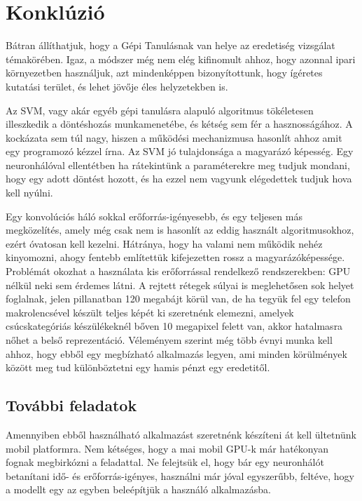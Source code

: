 \newpage
\section{Konklúzió}


Bátran állíthatjuk, hogy a Gépi Tanulásnak van helye az eredetiség vizsgálat témakörében.
Igaz, a módszer még nem elég kifinomult ahhoz, hogy azonnal ipari környezetben használjuk,
azt mindenképpen bizonyítottunk, hogy ígéretes kutatási terület, és lehet jövője éles 
helyzetekben is.


Az SVM, vagy akár egyéb gépi tanulásra alapuló algoritmus tökéletesen illeszkedik
a döntéshozás munkamenetébe, és kétség sem fér a hasznosságához. A kockázata sem 
túl nagy, hiszen a működési mechanizmusa hasonlít ahhoz amit egy programozó kézzel írna.
Az SVM jó tulajdonsága a magyarázó képesség. Egy neuronhálóval ellentétben ha rátekintünk
a paraméterekre meg tudjuk mondani, hogy egy adott döntést hozott, és ha ezzel nem vagyunk 
elégedettek tudjuk hova kell nyúlni.


Egy konvolúciós háló sokkal erőforrás-igényesebb, és egy teljesen más megközelítés,
amely még csak nem is hasonlít az eddig használt algoritmusokhoz, ezért óvatosan kell 
kezelni. Hátránya, hogy ha valami nem működik nehéz kinyomozni, ahogy fentebb említettük
kifejezetten rossz a magyarázóképessége. Problémát okozhat a használata kis erőforrással 
rendelkező rendszerekben: GPU nélkül neki sem érdemes látni. A rejtett rétegek súlyai is 
meglehetősen sok helyet foglalnak, jelen pillanatban 120 megabájt körül van, de ha tegyük
fel egy telefon makrolencsével készült teljes képét ki szeretnénk elemezni, 
amelyek csúcskategóriás készülékeknél bőven 10 megapixel felett van, akkor hatalmasra 
nőhet a belső reprezentáció. Véleményem szerint még több évnyi munka kell ahhoz, hogy 
ebből egy megbízható alkalmazás legyen, ami minden körülmények között meg tud 
különböztetni egy hamis pénzt egy eredetitől.


\subsection{További feladatok}

Amennyiben ebből használható alkalmazást szeretnénk készíteni át kell ültetnünk mobil 
platformra. Nem kétséges, hogy a mai mobil GPU-k már hatékonyan fognak megbirkózni a
feladattal. Ne felejtsük el, hogy bár egy neuronhálót betanítani idő- és erőforrás-igényes,
használni már jóval egyszerűbb, feltéve, hogy a modellt egy az egyben beleépítjük a használó
alkalmazásba.


